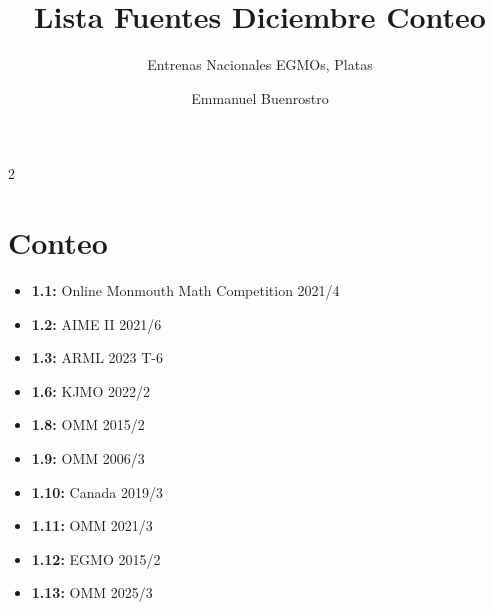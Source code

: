 \documentclass[11pt]{scrartcl}
\title {Lista Fuentes Diciembre Conteo}
\subtitle{Entrenas Nacionales EGMOs, Platas}
\author{Emmanuel Buenrostro}
\begin{document}
\maketitle
\begin{multicols}{2}
\section{Conteo}
\begin{itemize}
    \item \textbf{1.1: } Online Monmouth Math Competition 2021/4
    \item \textbf{1.2: } AIME II 2021/6
    \item \textbf{1.3: } ARML 2023 T-6
    \item \textbf{1.6: } KJMO 2022/2
    \item \textbf{1.8: } OMM 2015/2
    \item \textbf{1.9: } OMM 2006/3
    \item \textbf{1.10: } Canada 2019/3
    \item \textbf{1.11: } OMM 2021/3
    \item \textbf{1.12: } EGMO 2015/2
    \item \textbf{1.13: } OMM 2025/3
\end{itemize}
\end{multicols}
\end{document}
